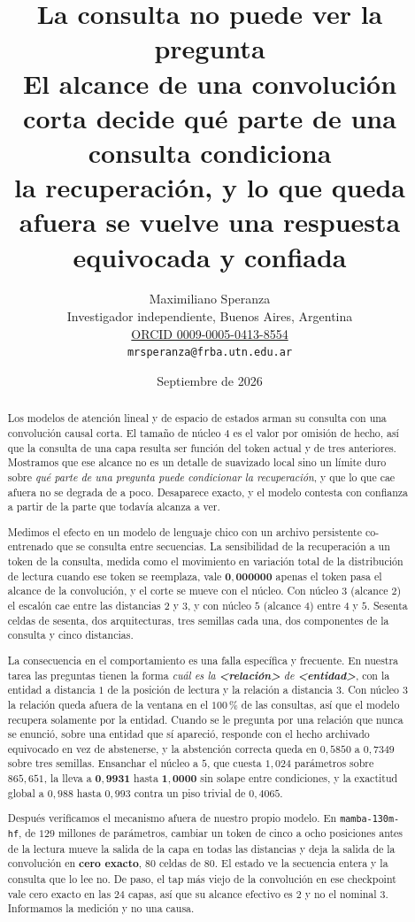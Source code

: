 \documentclass[11pt,a4paper]{article}
\title{\bfseries La consulta no puede ver la pregunta\\
\large El alcance de una convolución corta decide qué parte de una consulta condiciona\\
la recuperación, y lo que queda afuera se vuelve una respuesta equivocada y confiada}
\author{Maximiliano Speranza\\
\small Investigador independiente, Buenos Aires, Argentina\\
\small \href{https://orcid.org/0009-0005-0413-8554}{ORCID 0009-0005-0413-8554}\\
\small \texttt{mrsperanza@frba.utn.edu.ar}}
\date{Septiembre de 2026}
\begin{document}
\maketitle

\begin{abstract}
\noindent
Los modelos de atención lineal y de espacio de estados arman su consulta con una convolución causal
corta. El tamaño de núcleo $4$ es el valor por omisión de hecho, así que la consulta de una capa
resulta ser función del token actual y de tres anteriores. Mostramos que ese alcance no es un detalle
de suavizado local sino un límite duro sobre \emph{qué parte de una pregunta puede condicionar la
recuperación}, y que lo que cae afuera no se degrada de a poco. Desaparece exacto, y el modelo
contesta con confianza a partir de la parte que todavía alcanza a ver.

Medimos el efecto en un modelo de lenguaje chico con un archivo persistente co-entrenado que se
consulta entre secuencias. La sensibilidad de la recuperación a un token de la consulta, medida como
el movimiento en variación total de la distribución de lectura cuando ese token se reemplaza, vale
$\mathbf{0{,}000000}$ apenas el token pasa el alcance de la convolución, y el corte se mueve con el
núcleo. Con núcleo $3$ (alcance $2$) el escalón cae entre las distancias $2$ y $3$, y con núcleo $5$
(alcance $4$) entre $4$ y $5$. Sesenta celdas de sesenta, dos arquitecturas, tres semillas cada una,
dos componentes de la consulta y cinco distancias.

La consecuencia en el comportamiento es una falla específica y frecuente. En nuestra tarea las
preguntas tienen la forma \emph{cuál es la \textbf{<relación>} de \textbf{<entidad>}}, con la entidad
a distancia $1$ de la posición de lectura y la relación a distancia $3$. Con núcleo $3$ la relación
queda afuera de la ventana en el $100\,\%$ de las consultas, así que el modelo recupera solamente por
la entidad. Cuando se le pregunta por una relación que nunca se enunció, sobre una entidad que sí
apareció, responde con el hecho archivado equivocado en vez de abstenerse, y la abstención correcta
queda en $0{,}5850$ a $0{,}7349$ sobre tres semillas. Ensanchar el núcleo a $5$, que cuesta $1{,}024$
parámetros sobre $865{,}651$, la lleva a $\mathbf{0{,}9931}$ hasta $\mathbf{1{,}0000}$ sin solape
entre condiciones, y la exactitud global a $0{,}988$ hasta $0{,}993$ contra un piso trivial de
$0{,}4065$.

Después verificamos el mecanismo afuera de nuestro propio modelo. En \texttt{mamba-130m-hf}, de $129$
millones de parámetros, cambiar un token de cinco a ocho posiciones antes de la lectura mueve la
salida de la capa en todas las distancias y deja la salida de la convolución en \textbf{cero exacto},
$80$ celdas de $80$. El estado ve la secuencia entera y la consulta que lo lee no. De paso, el tap más
viejo de la convolución en ese checkpoint vale cero exacto en las $24$ capas, así que su alcance
efectivo es $2$ y no el nominal $3$. Informamos la medición y no una causa.


\end{abstract}
\end{document}
